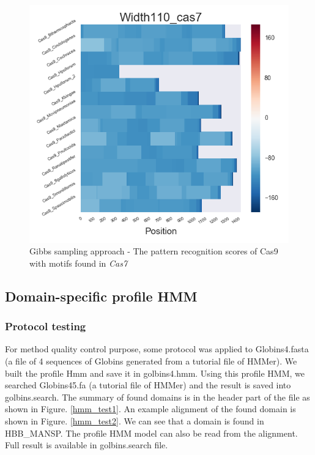 \documentclass[11pt, oneside]{article}
\begin{document}
\begin{figure}[htbp]
\begin{minipage}{0.32\textwidth}
  \end{minipage}
  \hfill
  \begin{minipage}{0.32\textwidth}
    \centering
    \includegraphics[width=1\textwidth]{images/Width110_cas7_heatmap} %
  \end{minipage}
  \caption{Gibbs sampling approach - The pattern recognition scores of Cas9 with motifs found in \textit{Cas7}}
  \label{fig:cas7_recog}
\end{figure}


\subsection{Domain-specific profile HMM}

\subsubsection{Protocol testing}

For method quality control purpose, some protocol was applied to Globins4.fasta (a file of 4 sequences of Globins generated from a tutorial file of HMMer). We built the profile Hmm and save it in golbins4.hmm. Using this profile HMM, we searched Globins45.fa (a tutorial file of HMMer) and the result is saved into golbins.search. The summary of found domains is in the header part of the file as shown in Figure. \ref{hmm_test1}.  An example alignment of the found domain is shown in Figure. \ref{hmm_test2}. We can see that a domain is found in HBB\_MANSP. The profile HMM model can also be read from the alignment. Full result is available in golbins.search file.
\end{document}
